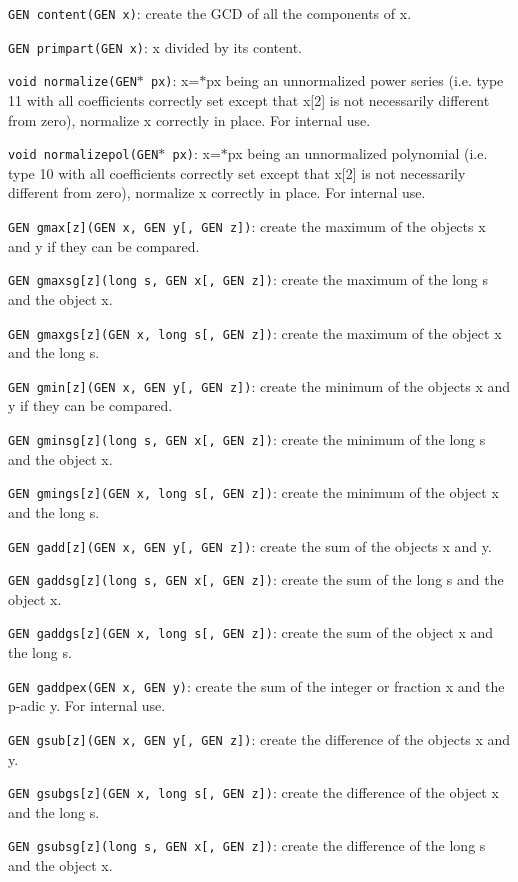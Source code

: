 {\tt GEN content(GEN x)}: create the GCD of all the components of x.

{\tt GEN primpart(GEN x)}: x divided by its content.

{\tt void normalize(GEN$*$ px)}: x=$*$px being an unnormalized power series
(i.e. type 11 with all coefficients correctly set except that x[2] is not
necessarily different from zero), normalize x correctly in place. For
internal use.

{\tt void normalizepol(GEN$*$ px)}: x=$*$px being an unnormalized polynomial
(i.e. type 10 with all coefficients correctly set except that x[2] is not
necessarily different from zero), normalize x correctly in place. For
internal use.


{\tt GEN gmax[z](GEN x, GEN y[, GEN z])}: create the maximum of the objects x
and y if they can be compared.

{\tt GEN gmaxsg[z](long s, GEN x[, GEN z])}: create the maximum of the long s
and the object x.

{\tt GEN gmaxgs[z](GEN x, long s[, GEN z])}: create the maximum of the object 
x and the long s.

{\tt GEN gmin[z](GEN x, GEN y[, GEN z])}: create the minimum of the objects x
and y if they can be compared.

{\tt GEN gminsg[z](long s, GEN x[, GEN z])}: create the minimum of the long s
and the object x.

{\tt GEN gmings[z](GEN x, long s[, GEN z])}: create the minimum of the object 
x and the long s.

{\tt GEN gadd[z](GEN x, GEN y[, GEN z])}: create the sum of the objects x and 
y.

{\tt GEN gaddsg[z](long s, GEN x[, GEN z])}: create the sum of the long s and 
the object x.

{\tt GEN gaddgs[z](GEN x, long s[, GEN z])}: create the sum of the object x 
and the long s.

{\tt GEN gaddpex(GEN x, GEN y)}: create the sum of the integer or fraction x
and the p-adic y. For internal use.

{\tt GEN gsub[z](GEN x, GEN y[, GEN z])}: create the difference of the objects
x and y.

{\tt GEN gsubgs[z](GEN x, long s[, GEN z])}: create the difference of the 
object x and the long s.

{\tt GEN gsubsg[z](long s, GEN x[, GEN z])}: create the difference of the long
s and the object x.

